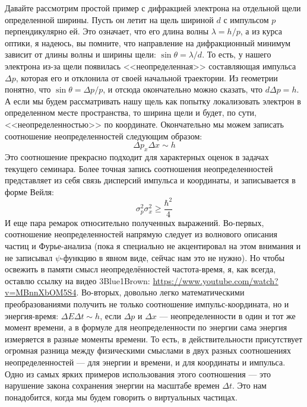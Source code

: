 \documentclass[12pt]{article}
\begin{document}
\noindent
Давайте рассмотрим простой пример с дифракцией электрона на отдельной щели определенной ширины. Пусть он летит на щель шириной $d$ с импульсом $p$ перпендикулярно ей. Это означает, что его длина волны $\lambda = h/p$, а из курса оптики, я надеюсь, вы помните, что направление на дифракционный минимум зависит от длины волны и ширины щели: $\sin{\theta} = \lambda/d$. То есть, у нашего электрона из-за щели появилась <<неопределенная>> составляющая импульса $\Delta p$, которая его и отклонила от своей начальной траектории. Из геометрии понятно, что $\sin{\theta} = \Delta p / p$, и отсюда окончательно можно сказать, что $d\Delta p = h$. А если мы будем рассматривать нашу щель как попытку локализовать электрон в определенном месте пространства, то ширина щели и будет, по сути, <<неопределенностью>> по координате. Окончательно мы можем записать соотношение неопределенностей следующим образом:
\begin{equation}
    \Delta p_x \Delta x \sim h
\end{equation}
Это соотношение прекрасно подходит для характерных оценок в задачах текущего семинара. Более точная запись соотношения неопределенностей представляет из себя связь дисперсий импульса и координаты, и записывается в форме Вейля:
\begin{equation*}
    \sigma^2_p \sigma^2_x \ge \dfrac{\hbar^2}{4}
\end{equation*}
И еще пара ремарок относительно полученных выражений. Во-первых, соотношение неопределенностей напрямую следует из волнового описания частиц и Фурье-анализа (пока я специально не акцентировал на этом внимания и не записывал $\psi$-функцию в явном виде, сейчас нам это не нужно). Но чтобы освежить в памяти смысл неопределённостей частота-время, я, как всегда, оставлю ссылку на видео 3Blue1Brown: \url{https://www.youtube.com/watch?v=MBnnXbOM5S4}. Во-вторых, довольно легко математическими преобразованиями получить не только соотношение импульс-координата, но и энергия-время: $\Delta E \Delta t \sim h$, если $\Delta p$ и $\Delta x$ --- неопределенности в один и тот же момент времени, а в формуле для неопределенности по энергии сама энергия измеряется в разные моменты времени. То есть, в действительности присутствует огромная разница между физическими смыслами в двух разных соотношениях неопределенностей --- для энергии и времени, и для
координаты и импульса. Одно из самых ярких примеров использования этого соотношения --- это нарушение закона сохранения энергии на масштабе времен $\Delta t$. Это нам понадобится, когда мы будем говорить о виртуальных частицах.
\end{document}
